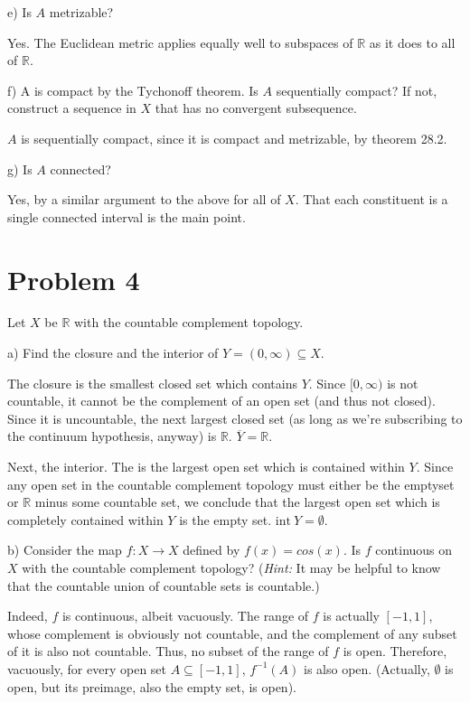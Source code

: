 \documentclass[11pt]{article}
\begin{document}
e) Is \(A\) metrizable?

Yes. The Euclidean metric applies equally well to subspaces of \(\mathbb{R}\) as
it does to all of \(\mathbb{R}\). 

f) A is compact by the Tychonoff theorem. Is \(A\) sequentially compact? If not,
construct a sequence in \(X\) that has no convergent subsequence. 

\(A\) is sequentially compact, since it is compact and metrizable, by theorem
28.2.

g) Is \(A\) connected? 

Yes, by a similar argument to the above for all of \(X\). That each constituent is
a single connected interval is the main point. 


\section{Problem 4}
\label{sec:org7db0c63}
Let \(X\) be \(\mathbb{R}\) with the countable complement topology. 

a) Find the closure and the interior of \(Y = (0,\infty)\subseteq X\). 

The closure is the smallest closed set which contains \(Y\). Since \([0,
\infty)\) is not countable, it cannot be the complement of an open set (and thus
not closed). Since it is uncountable, the next largest closed set (as long as
we're subscribing to the continuum hypothesis, anyway) is \(\mathbb{R}\).
\(\overline{Y} = \mathbb{R}\). 

Next, the interior. The is the largest open set which is contained within \(Y\).
Since any open set in the countable complement topology must either be the
emptyset or \(\mathbb{R}\) minus some countable set, we conclude that the largest
open set which is completely contained within \(Y\) is the empty set. \(\text{int}\
Y = \emptyset\).

b) Consider the map \(f: X\rightarrow X\) defined by \(f(x) = cos(x)\). Is \(f\)
continuous on \(X\) with the countable complement topology? (\textit{Hint:} It may
be helpful to know that the countable union of countable sets is countable.)

Indeed, \(f\) is continuous, albeit vacuously. The range of \(f\) is actually \([-1,
1]\), whose complement is obviously not countable, and the complement of any
subset of it is also not countable. Thus, no subset of the range of \(f\) is open.
Therefore, vacuously, for every open set  \(A \subseteq [-1, 1]\), \(f^{-1}(A)\) is
also open. (Actually, \(\emptyset\) is open, but its preimage, also the empty set,
is open). 
\end{document}
